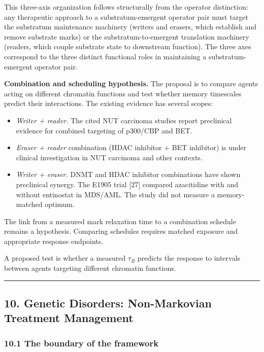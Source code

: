 \documentclass[
]{article}
\providecommand{\tightlist}{%
  \setlength{\itemsep}{0pt}\setlength{\parskip}{0pt}}
\begin{document}
This three-axis organization follows structurally from the operator
distinction: any therapeutic approach to a substratum-emergent operator
pair must target the substratum maintenance machinery (writers and
erasers, which establish and remove substrate marks) or the
substratum-to-emergent translation machinery (readers, which couple
substrate state to downstream function). The three axes correspond to
the three distinct functional roles in maintaining a substratum-emergent
operator pair.

\textbf{Combination and scheduling hypothesis.} The proposal is to
compare agents acting on different chromatin functions and test whether
memory timescales predict their interactions. The existing evidence has
several scopes:

\begin{itemize}
\tightlist
\item
  \emph{Writer + reader.} The cited NUT carcinoma studies report
  preclinical evidence for combined targeting of p300/CBP and BET.
\item
  \emph{Eraser + reader} combination (HDAC inhibitor + BET inhibitor) is
  under clinical investigation in NUT carcinoma and other contexts.
\item
  \emph{Writer + eraser.} DNMT and HDAC inhibitor combinations have
  shown preclinical synergy. The E1905 trial {[}27{]} compared
  azacitidine with and without entinostat in MDS/AML. The study did not
  measure a memory-matched optimum.
\end{itemize}

The link from a measured mark relaxation time to a combination schedule
remains a hypothesis. Comparing schedules requires matched exposure and
appropriate response endpoints.

A proposed test is whether a measured \(\tau_B\) predicts the response
to intervals between agents targeting different chromatin functions.

\begin{center}\rule{0.5\linewidth}{0.5pt}\end{center}

\hypertarget{genetic-disorders-non-markovian-treatment-management}{%
\subsection{10. Genetic Disorders: Non-Markovian Treatment
Management}\label{genetic-disorders-non-markovian-treatment-management}}

\hypertarget{the-boundary-of-the-framework}{%
\subsubsection{10.1 The boundary of the
framework}\label{the-boundary-of-the-framework}}
\end{document}
